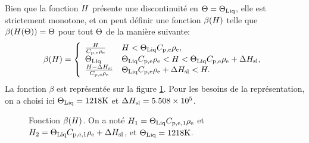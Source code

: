 Bien que la fonction $H$ présente une discontinuité en
$\Theta = \Theta_\text{Liq}$, elle est strictement monotone, et on peut
définir une fonction $\beta(H)$ telle que
$\beta(H(\Theta)) = \Theta$ pour tout
$\Theta$ de la manière suivante:
\begin{equation}\label{eq:beta}
  \beta(\enthalpy) = \left\{
  \begin{array}{ll}
    \frac{\enthalpy}{\electrolytehc\electrolytedensity} %
      & \enthalpy < \tliq \electrolytehc\electrolytedensity,\\
    \tliq %
      & \tliq \electrolytehc\electrolytedensity < \enthalpy < \tliq \electrolytehc\electrolytedensity + \fusionenthalpy,\\
    \frac{\enthalpy - \fusionenthalpy}{\electrolytehc\electrolytedensity} %
      & \tliq\electrolytehc\electrolytedensity + \fusionenthalpy < \enthalpy.\\
  \end{array}
  \right.
\end{equation}
La fonction $\beta$ est représentée sur la figure \ref{fig:beta}. Pour
les besoins de la représentation, on a choisi ici $\Theta_\text{Liq} =
\num{1218}\si{\kelvin}$ et $\Delta H_\mathrm{sl} = \num{5.508e5}$.
\begin{figure}
  \begin{center}
    
    \caption{Fonction $\beta(H)$. On a noté $H_1 =
      \Theta_\text{Liq}C_{\mathrm{p,e,1}}\rho_\mathrm{e}$ et $H_2 =
      \Theta_\text{Liq}C_{\mathrm{p,e,1}}\rho_\mathrm{e} + \Delta H_\mathrm{sl}$, et
      $\Theta_\text{Liq} = 1218\si{\kelvin}$.}
    \label{fig:beta}
  \end{center}
\end{figure}

